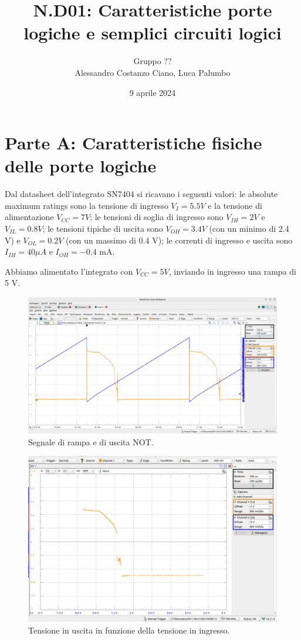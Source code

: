 \documentclass[10pt,a4paper]{article}
\author{Gruppo ?? \\ Alessandro Costanzo Ciano, Luca Palumbo}
\title{N.D01: Caratteristiche porte logiche e semplici circuiti logici}
\begin{document}
\date{9 aprile 2024}
\maketitle

\section*{Parte A: Caratteristiche fisiche delle porte logiche}
Dal datasheet dell'integrato SN7404 si ricavano i seguenti valori: le absolute maximum ratings sono la tensione di ingresso $V_I = 5.5 V$ e la tensione di alimentazione $V_{CC} = 7 V$; le tensioni di soglia di ingresso sono $V_{IH} = 2 V$ e $V_{IL} = 0.8 V$; le tensioni tipiche di uscita sono $V_{OH} = 3.4 V$ (con un minimo di 2.4 V) e $V_{OL} = 0.2 V$ (con un massimo di 0.4 V); le correnti di ingresso e uscita sono $I_{IH} = 40 \mu A$ e $I_{OH} = -0.4$ mA. 

Abbiamo alimentato l'integrato con $V_{CC} = 5 V$, inviando in ingresso una rampa di 5 V.

\begin{figure}[htp]
\begin{center}
\includegraphics[scale=0.25]{fig1.png}
\caption{Segnale di rampa e di uscita NOT.}
\label{fig1}
\end{center}
\end{figure}

\begin{figure}[htp]
    \begin{center}
    \includegraphics[scale=0.25]{fig2.png}
    \caption{Tensione in uscita in funzione della tensione in ingresso.}
    \label{fig2}
    \end{center}
\end{figure}
\end{document}
